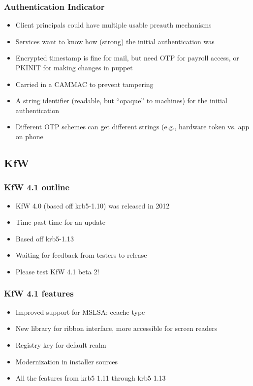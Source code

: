 \documentclass{beamer}
\begin{document}
\begin{frame}
\frametitle{Authentication Indicator}
\begin{itemize}
\item{Client principals could have multiple usable preauth mechanisms}
\pause
\item{Services want to know how (strong) the initial authentication was}
\pause
\item{Encrypted timestamp is fine for mail, but need OTP for payroll access,
	or PKINIT for making changes in puppet}
\pause
\item{Carried in a CAMMAC to prevent tampering}
\pause
\item{A string identifier (readable, but ``opaque'' to machines) for
	the initial authentication}
\pause
\item{Different OTP schemes can get different strings (e.g., hardware token
	vs. app on phone}
\end{itemize}
\end{frame}

\subsection{KfW}

\begin{frame}
\frametitle{KfW 4.1 outline}
\begin{itemize}
\item{KfW 4.0 (based off krb5-1.10) was released in 2012}
\item{\sout{Time} past time for an update}
\item{Based off krb5-1.13}
\item{Waiting for feedback from testers to release}
\item{Please test KfW 4.1 beta 2!}
\end{itemize}
\end{frame}

\begin{frame}
\frametitle{KfW 4.1 features}
\begin{itemize}
\item{Improved support for MSLSA: ccache type}
\item{New library for ribbon interface, more accessible for screen readers}
\item{Registry key for default realm}
\item{Modernization in installer sources}
\item{All the features from krb5 1.11 through krb5 1.13}
\end{itemize}
\end{frame}
\end{document}
